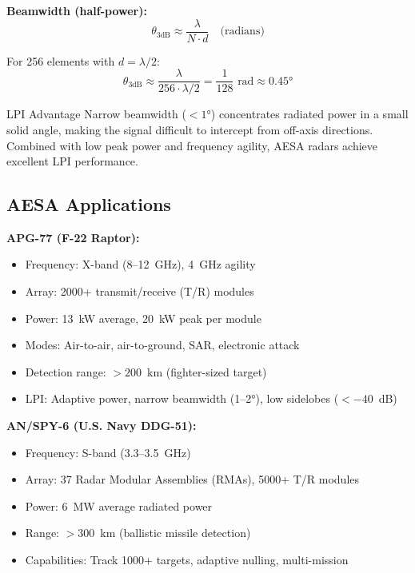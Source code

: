 \textbf{Beamwidth (half-power):}
\begin{equation}
\theta_{3\text{dB}} \approx \frac{\lambda}{N \cdot d} \quad \text{(radians)}
\end{equation}

For 256 elements with $d = \lambda/2$:
\begin{equation}
\theta_{3\text{dB}} \approx \frac{\lambda}{256 \cdot \lambda/2} = \frac{1}{128} \text{ rad} \approx 0.45°
\end{equation}

\begin{calloutbox}{LPI Advantage}
Narrow beamwidth ($<1°$) concentrates radiated power in a small solid angle, making the signal difficult to intercept from off-axis directions. Combined with low peak power and frequency agility, AESA radars achieve excellent LPI performance.
\end{calloutbox}

\subsection{AESA Applications}

\textbf{APG-77 (F-22 Raptor):}
\begin{itemize}
\item Frequency: X-band (8--12~GHz), 4~GHz agility
\item Array: 2000+ transmit/receive (T/R) modules
\item Power: 13~kW average, 20~kW peak per module
\item Modes: Air-to-air, air-to-ground, SAR, electronic attack
\item Detection range: $>200$~km (fighter-sized target)
\item LPI: Adaptive power, narrow beamwidth (1--2°), low sidelobes ($<-40$~dB)
\end{itemize}

\textbf{AN/SPY-6 (U.S. Navy DDG-51):}
\begin{itemize}
\item Frequency: S-band (3.3--3.5~GHz)
\item Array: 37 Radar Modular Assemblies (RMAs), 5000+ T/R modules
\item Power: 6~MW average radiated power
\item Range: $>300$~km (ballistic missile detection)
\item Capabilities: Track 1000+ targets, adaptive nulling, multi-mission
\end{itemize}

